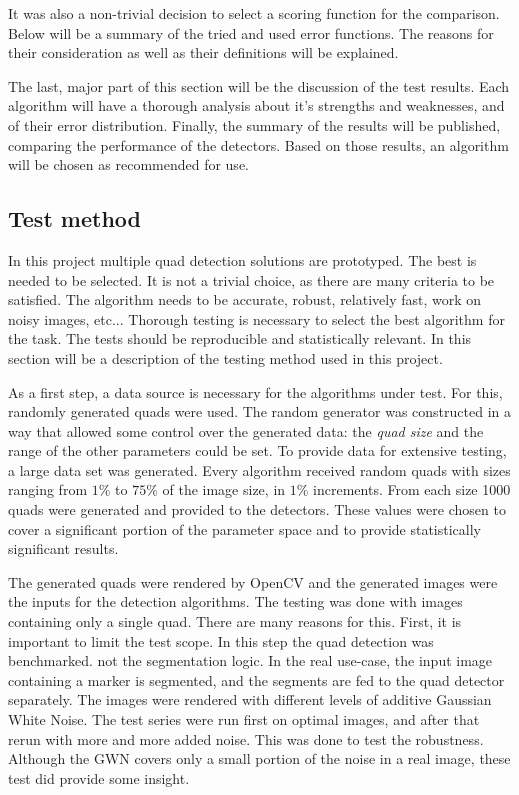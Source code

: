 It was also a non-trivial decision to select a scoring function for the comparison.
Below will be a summary of the tried and used error functions.
The reasons for their consideration as well as their definitions will be explained.

The last, major part of this section will be the discussion of the test results.
Each algorithm will have a thorough analysis about it's strengths and weaknesses, and of their error distribution.
Finally, the summary of the results will be published, comparing the performance of the detectors.
Based on those results, an algorithm will be chosen as recommended for use.

\subsection{Test method}

In this project multiple quad detection solutions are prototyped.
The best is needed to be selected.
It is not a trivial choice, as there are many criteria to be satisfied.
The algorithm needs to be accurate, robust, relatively fast, work on noisy images, etc...
Thorough testing is necessary to select the best algorithm for the task.
The tests should be reproducible and statistically relevant.
In this section will be a description of the testing method used in this project.

As a first step, a data source is necessary for the algorithms under test.
For this, randomly generated quads were used.
The random generator was constructed in a way that allowed some control over the generated data: the \textit{quad size} and the range of the other parameters could be set.
To provide data for extensive testing, a large data set was generated.
Every algorithm received random quads with sizes ranging from $1\%$ to $75\%$ of the image size, in $1\%$ increments.
From each size 1000 quads were generated and provided to the detectors.
These values were chosen to cover a significant portion of the parameter space and to provide statistically significant results.

The generated quads were rendered by OpenCV and the generated images were the inputs for the detection algorithms.
The testing was done with images containing only a single quad.
There are many reasons for this.
First, it is important to limit the test scope.
In this step the quad detection was benchmarked. not the segmentation logic.
In the real use-case, the input image containing a marker is segmented, and the segments are fed to the quad detector separately.
The images were rendered with different levels of additive Gaussian White Noise.
The test series were run first on optimal images, and after that rerun with more and more added noise.
This was done to test the robustness.
Although the GWN covers only a small portion of the noise in a real image, these test did provide some insight.

